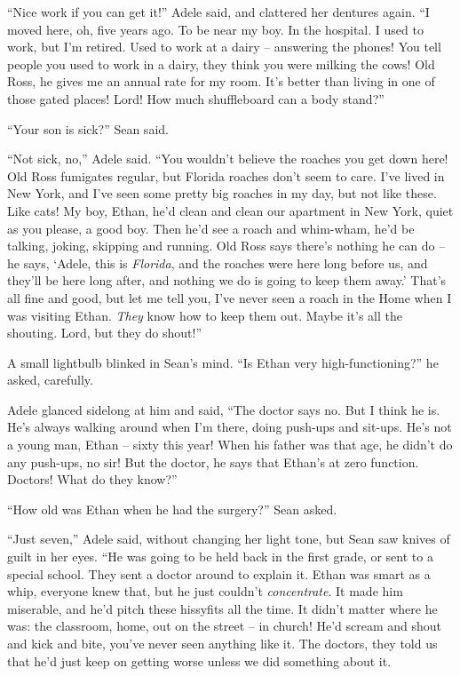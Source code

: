 “Nice work if you can get it!” Adele said, and clattered her 
dentures again. “I moved here, oh, five years ago. To be near my boy. 
In the hospital. I used to work, but I'm retired. Used to work at a 
dairy -- answering the phones! You tell people you used to work in a 
dairy, they think you were milking the cows! Old Ross, he gives me an 
annual rate for my room. It's better than living in one of those gated 
places! Lord! How much shuffleboard can a body stand?”

“Your son is sick?” Sean said.

“Not sick, no,” Adele said. “You wouldn't believe the roaches you 
get down here! Old Ross fumigates regular, but Florida roaches don't 
seem to care. I've lived in New York, and I've seen some pretty big 
roaches in my day, but not like these. Like cats! My boy, Ethan, he'd 
clean and clean our apartment in New York, quiet as you please, a good 
boy. Then he'd see a roach and whim-wham, he'd be talking, joking, 
skipping and running. Old Ross says there's nothing he can do -- he 
says, `Adele, this is \emph{Florida}, and the roaches were here long 
before us, and they'll be here long after, and nothing we do is going 
to keep them away.' That's all fine and good, but let me tell you, I've 
never seen a roach in the Home when I was visiting Ethan. \emph{They} 
know how to keep them out. Maybe it's all the shouting. Lord, but they 
do shout!”

A small lightbulb blinked in Sean's mind. “Is Ethan very 
high-functioning?” he asked, carefully.

Adele glanced sidelong at him and said, “The doctor says no. But I 
think he is. He's always walking around when I'm there, doing push-ups 
and sit-ups. He's not a young man, Ethan -- sixty this year! When his 
father was that age, he didn't do any push-ups, no sir! But the doctor, 
he says that Ethan's at zero function. Doctors! What do they know?”

“How old was Ethan when he had the surgery?” Sean asked.

“Just seven,” Adele said, without changing her light tone, but Sean 
saw knives of guilt in her eyes. “He was going to be held back in the 
first grade, or sent to a special school. They sent a doctor around to 
explain it. Ethan was smart as a whip, everyone knew that, but he just 
couldn't \emph{concentrate}. It made him miserable, and he'd pitch 
these hissyfits all the time. It didn't matter where he was: the 
classroom, home, out on the street -- in church! He'd scream and shout 
and kick and bite, you've never seen anything like it. The doctors, 
they told us that he'd just keep on getting worse unless we did 
something about it.

